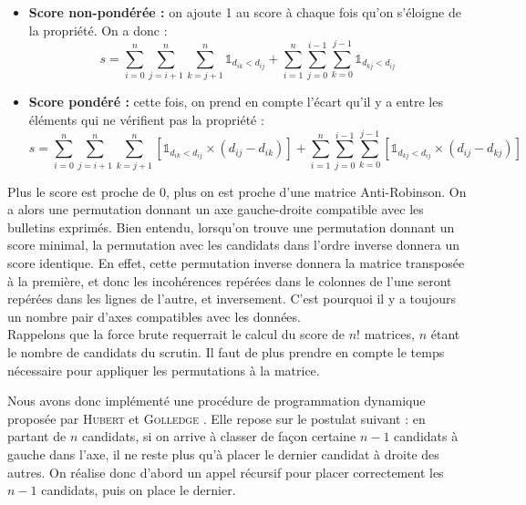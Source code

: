 \documentclass[11pt, a4paper]{article}
\newcommand{\somme}[2]{\underset{#1}{\overset{#2}{\sum}}}
\begin{document}
\begin{itemize}
\item \textbf{Score non-pond\'{e}r\'{e}e :} on ajoute 1 au score à chaque fois qu'on s'éloigne de la propriété. On a donc :
\[
s = \somme{i = 0}{n} \somme{j = i+1}{n} \somme{k = j+1}{n} \mathds{1}_{d_{ik} < d_{ij}}+ \somme{i = 1}{n} \somme{j = 0}{i-1} \somme{k = 0}{j-1} \mathds{1}_{d_{kj} < d_{ij}}
\]

\item \textbf{Score pond\'{e}r\'{e} :} cette fois, on prend en compte l'écart qu'il y a entre les éléments qui ne vérifient pas la propriété :
\[
s = \somme{i = 0}{n} \somme{j = i+1}{n} \somme{k = j+1}{n} [\mathds{1}_{d_{ik} < d_{ij}} \times (d_{ij} - d_{ik})]+ \somme{i = 1}{n} \somme{j = 0}{i-1} \somme{k = 0}{j-1} [\mathds{1}_{d_{kj} < d_{ij}} \times (d_{ij} - d_{kj})]
\]

\end{itemize}

Plus le score est proche de 0, plus on est proche d'une matrice Anti-Robinson. On a alors une permutation donnant un axe gauche-droite compatible avec les bulletins exprimés. Bien entendu, lorsqu'on trouve une permutation donnant un score minimal, la permutation avec les candidats dans l'ordre inverse donnera un score identique. En effet, cette permutation inverse donnera la matrice transpos\'{e}e \`{a} la premi\`{e}re, et donc les incoh\'{e}rences rep\'{e}r\'{e}es dans le colonnes de l'une seront rep\'{e}r\'{e}es dans les lignes de l'autre, et inversement. C'est pourquoi il y a toujours un nombre pair d'axes compatibles avec les donn\'{e}es.\\

Rappelons que la force brute requerrait le calcul du score de $n!$ matrices, $n$ \'{e}tant le nombre de candidats du scrutin. Il faut de plus prendre en compte le temps n\'{e}cessaire pour appliquer les permutations \`{a} la matrice.

Nous avons donc implémenté une procédure de programmation dynamique proposée par \textsc{Hubert} et \textsc{Golledge} \cite{huberDynamic}. Elle repose sur le postulat suivant : en partant de $n$ candidats, si on arrive \`{a} classer de façon certaine $n-1$ candidats à gauche dans l'axe, il ne reste plus qu'\`{a} placer le dernier candidat \`{a} droite des autres. On r\'{e}alise donc d'abord un appel r\'{e}cursif pour placer correctement les $n-1$ candidats, puis on place le dernier.

\end{document}
